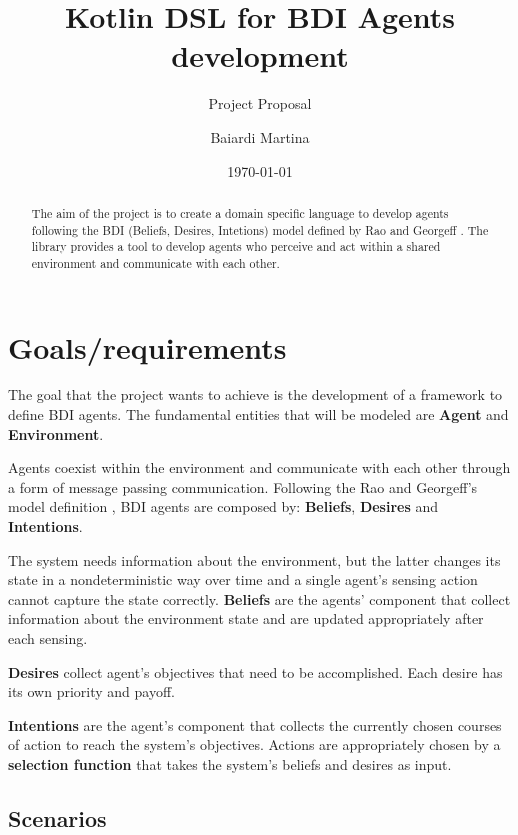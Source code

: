\documentclass{scrartcl}
\title{\LARGE
    Kotlin DSL for BDI Agents development
}
\subtitle{Project Proposal}
\author{
    Baiardi Martina \\ \emailaddr{martina.baiardi4@studio.unibo.it}
}
\date{\today}
\begin{document}
\maketitle

\begin{abstract}
    The aim of the project is to create a domain specific language to develop agents following the BDI (Beliefs, Desires, Intetions) model defined by Rao and Georgeff \cite{rao1995bdi}.
    The library provides a tool to develop agents who perceive and act within a shared environment and communicate with each other.
\end{abstract}

\section{Goals/requirements}

The goal that the project wants to achieve is the development of a framework to define BDI agents.
The fundamental entities that will be modeled are \textbf{Agent} and \textbf{Environment}.

\smallskip

Agents coexist within the environment and communicate with each other through a form of message passing communication.
Following the Rao and Georgeff's model definition \cite{rao1995bdi}, BDI agents are composed by: \textbf{Beliefs}, \textbf{Desires} and \textbf{Intentions}.

\bigskip

The system needs information about the environment, but the latter changes its state in a nondeterministic way over time
and a single agent's sensing action cannot capture the state correctly.
\textbf{Beliefs} are the agents' component that collect information about the environment state and are updated appropriately after each sensing.

\bigskip

\textbf{Desires} collect agent's objectives that need to be accomplished.
Each desire has its own priority and payoff.

\bigskip

\textbf{Intentions} are the agent's component that collects the currently chosen courses of action to reach the system's objectives.
Actions are appropriately chosen by a \textbf{selection function} that takes the system's beliefs and desires as input.


\subsection{Scenarios}
\end{document}
